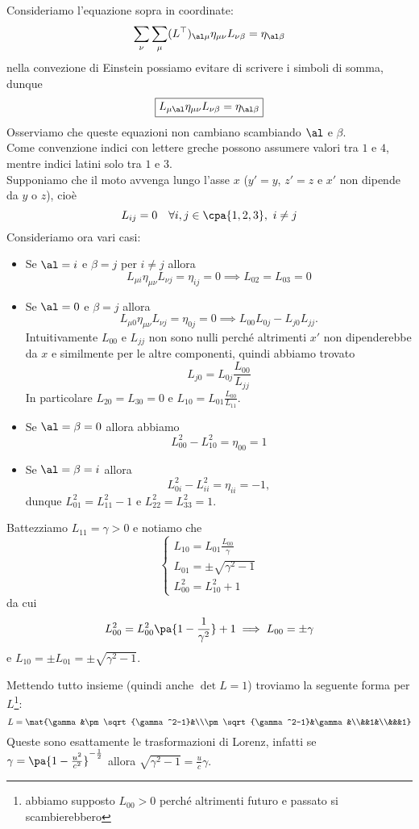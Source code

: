 \noindent Consideriamo l'equazione sopra in coordinate:
\[\sum_\nu\sum_\mu(L^\top)_{\al\mu}\eta_{\mu\nu}L_{\nu\beta}=\eta_{\al\beta}\]
nella convezione di Einstein possiamo evitare di scrivere i simboli di somma, dunque
\[\boxed{L_{\mu\al}\eta_{\mu\nu}L_{\nu\beta}=\eta_{\al\beta}}\]
Osserviamo che queste equazioni non cambiano scambiando $\al$ e $\beta$.\\
Come convenzione indici con lettere greche possono assumere valori tra $1$ e $4$, mentre indici latini solo tra $1$ e $3$.\\
Supponiamo che il moto avvenga lungo l'asse $x$ ($y'=y$, $z'=z$ e $x'$ non dipende da $y$ o $z$), cio\`e
\[L_{ij}=0 \quad \forall i,j\in\cpa{1,2,3},\ i\neq j\]
Consideriamo ora vari casi:
\begin{itemize}
\item Se $\al=i$ e $\beta=j$ per $i\neq j$ allora
\[L_{\mu i}\eta_{\mu\nu}L_{\nu j}=\eta_{ij}=0\implies L_{02}=L_{03}=0\]
\item Se $\al=0$ e $\beta=j$ allora
\[L_{\mu0}\eta_{\mu\nu}L_{\nu j}=\eta_{0j}=0\implies L_{00}L_{0j}-L_{j0}L_{jj}.\]
Intuitivamente $L_{00}$ e $L_{jj}$ non sono nulli perch\'e altrimenti $x'$ non dipenderebbe da $x$ e similmente per le altre componenti, quindi abbiamo trovato
\[L_{j0}=L_{0j}\frac{L_{00}}{L_{jj}}\]
In particolare $L_{20}=L_{30}=0$ e $L_{10}=L_{01}\frac{L_{00}}{L_{11}}$.
\item Se $\al=\beta=0$ allora abbiamo
\[L_{00}^2-L_{10}^2=\eta_{00}=1\]
\item Se $\al=\beta=i$ allora
\[L_{0i}^2-L_{ii}^2=\eta_{ii}=-1,\]
dunque $L_{01}^2=L_{11}^2-1$ e $L_{22}^2=L_{33}^2=1$.
\end{itemize}
\noindent
Battezziamo $L_{11}=\gamma>0$ e notiamo che
\[\begin{cases}
L_{10}=L_{01}\frac{L_{00}}{\gamma}\\
L_{01}=\pm\sqrt{\gamma^2-1}\\
L^2_{00}=L^2_{10}+1
\end{cases}\]
da cui
\[L_{00}^2=L_{00}^2\pa{1-\frac1{\gamma^2}}+1\implies L_{00}=\pm\gamma\]
e $L_{10}=\pm L_{01}=\pm \sqrt{\gamma^2-1}$.
\medskip

\noindent Mettendo tutto insieme (quindi anche $\det L=1$) troviamo la seguente forma per $L$\footnote{abbiamo supposto $L_{00}>0$ perch\'e altrimenti futuro e passato si scambierebbero}:
\[L=\mat{\gamma &\pm\sqrt{\gamma^2-1}&\\\pm\sqrt{\gamma^2-1}&\gamma&\\&&1&\\&&&1}\]
Queste sono esattamente le trasformazioni di Lorenz, infatti se $\gamma=\pa{1-\frac{u^2}{c^2}}^{-\frac12}$ allora $\sqrt{\gamma^2-1}=\frac uc\gamma$.


